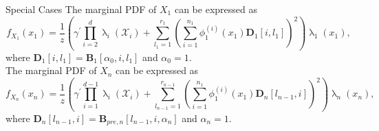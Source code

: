 Special Cases
The marginal PDF of $X_1$ can be expressed as
\begin{equation}
	f_{X_1}(x_1) = \frac{1}{z} \left(\gamma^{\prime} \prod_{i=2}^{d} \uplambda_i(\mathcal{X}_i) + \sum_{l_1=1}^{r_1} \left(\sum_{i=1}^{n_1} \phi^{(i)}_1(x_1) \bm{D}_1[i, l_1] \right)^2 \right) \uplambda_1(x_1),
\end{equation}
where $\bm{D}_1[i, l_1] = \bm{B}_1[\alpha_0, i, l_1]$ and $\alpha_0 = 1$.\\
The marginal PDF of $X_n$ can be expressed as
\begin{equation}
	f_{X_n}(x_n) = \frac{1}{z} \left(\gamma^{\prime} \prod_{i=1}^{d-1} \uplambda_i(\mathcal{X}_i) + \sum_{l_{n-1}=1}^{r_{n-1}} \left(\sum_{i=1}^{n_1} \phi^{(i)}_1(x_1) \bm{D}_n[l_{n-1},i] \right)^2 \right) \uplambda_n(x_n),
\end{equation}
where $\bm{D}_n[l_{n-1},i] = \bm{B}_{pre,n}[l_{n-1}, i, \alpha_n]$ and $\alpha_n = 1$.
